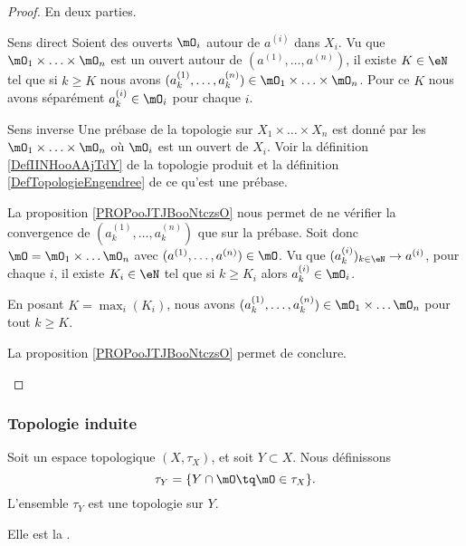 \begin{proof}
    En deux parties.
    \begin{subproof}
        \item[Sens direct]
            Soient des ouverts \( \mO_i\) autour de \( a^{(i)}\) dans \( X_i\). Vu que \( \mO_1\times \ldots\times \mO_n\) est un ouvert autour de \( (a^{(1)},\ldots, a^{(n)})\), il existe \( K\in \eN\) tel que si \( k\geq K\) nous avons \( (a^{(1)}_k,\ldots, a^{(n)}_k)\in \mO_1\times \ldots \times \mO_n\). Pour ce \( K\) nous avons séparément \( a^{(i)}_k\in \mO_i\) pour chaque \( i\).

        \item[Sens inverse]
            Une prébase de la topologie sur \( X_1\times \ldots\times X_n\) est donné par les \( \mO_1\times \ldots \times \mO_n\) où \( \mO_i\) est un ouvert de \( X_i\). Voir la définition \ref{DefIINHooAAjTdY} de la topologie produit et la définition \ref{DefTopologieEngendree} de ce qu'est une prébase.

            La proposition \ref{PROPooJTJBooNtczsO} nous permet de ne vérifier la convergence de \( (a^{(1)}_k,\ldots, a^{(n)}_k)\) que sur la prébase. Soit donc \(\mO= \mO_1\times \ldots \mO_n\) avec \( (a^{(1)},\ldots, a^{(n)})\in \mO\). Vu que \( (a^{(i)}_k)_{k\in \eN}\to a^{(i)}\), pour chaque \( i\), il existe \( K_i\in \eN\) tel que si \( k\geq K_i\) alors \( a^{(i)}_k\in \mO_i\).

            En posant \( K=\max_i(K_i)\), nous avons \( (a^{(1)}_k,\ldots, a^{(n)}_k)\in \mO_1\times \ldots \mO_n\) pour tout \( k\geq K\).

            La proposition \ref{PROPooJTJBooNtczsO} permet de conclure.
    \end{subproof}
\end{proof}

\subsubsection{Topologie induite}

\begin{propositionDef} \label{DefVLrgWDB}
  Soit un espace topologique \( (X, \tau_X) \), et soit \( Y \subset X \). Nous définissons
  \begin{equation}
      \tau_Y=\{ Y\cap\mO\tq \mO\in\tau_X \}.
  \end{equation}
    L'ensemble \( \tau_Y\) est une topologie sur \( Y\).  

  Elle est la .
\end{propositionDef}


